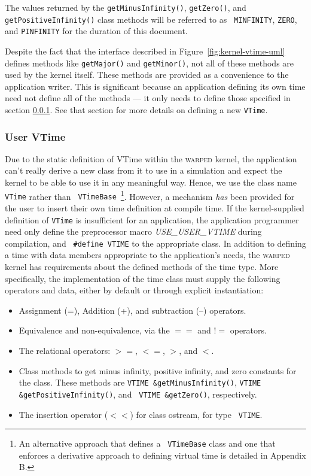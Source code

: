 \documentclass[11pt]{article}
\begin{document}
The values returned by the {\tt getMinusInfinity()}, {\tt getZero()}, and
{\tt getPositiveInfinity()} class methods will be referred to as {\tt
MINFINITY}, {\tt ZERO}, and {\tt PINFINITY} for the duration of this
document.

Despite the fact that the interface described in
Figure~\ref{fig:kernel-vtime-uml} defines methods like {\tt getMajor()}
and {\tt getMinor()}, not all of these methods are used by the kernel
itself.  These methods are provided as a convenience to the application
writer.  This is significant because an application defining its own time
need not define all of the methods --- it only needs to define those
specified in section \ref{user-defined}.  See that section for more
details on defining a new {\tt VTime}.

\subsubsection{User VTime}\label{user-defined}

Due to the static definition of VTime within the \textsc{warped} kernel,
the application can't really derive a new class from it to use in a
simulation and expect the kernel to be able to use it in any meaningful
way.  Hence, we use the class name {\tt VTime} rather than {\tt
VTimeBase}~\footnote{An alternative approach that defines a {\tt
VTimeBase} class and one that enforces a derivative approach to defining
virtual time is detailed in Appendix B.}.  However, a mechanism \emph{has}
been provided for the user to insert their own time definition at compile
time.  If the kernel-supplied definition of {\tt VTime} is insufficient
for an application, the application programmer need only define the
preprocessor macro {\it USE\_USER\_VTIME} during compilation, and {\tt
\#define VTIME} to the appropriate class.  In addition to defining a time
with data members appropriate to the application's needs, the
\textsc{warped} kernel has requirements about the defined methods of the
time type.  More specifically, the implementation of the time class must
supply the following operators and data, either by default or through
explicit instantiation:

\begin{itemize}

\item Assignment (=), Addition (+), and subtraction (--) operators.

\item Equivalence and non-equivalence, via the $==$ and $!=$ operators.

\item The relational operators: $>=$, $<=$, $>$, and $<$.

\item Class methods to get minus infinity, positive infinity, and zero
      constants for the class.  These methods are {\tt VTIME
      \&getMinusInfinity()}, {\tt VTIME \&getPositiveInfinity()}, and {\tt
      VTIME \&getZero()}, respectively. 

\item The insertion operator ($<<$) for class ostream, for type {\tt
      VTIME}. 

\end{itemize}
\end{document}
